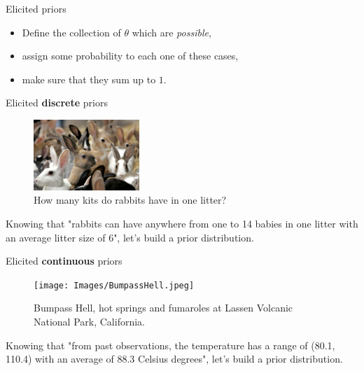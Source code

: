 \begin{frame}{Elicited priors}

	\begin{block}{}
		\begin{itemize}
			\item Define the collection of $\theta$ which are \textit{possible},
			\item assign some probability to each one of these cases,
			\item make sure that they sum up to $1$.
		\end{itemize}
	\end{block}

\end{frame}

\begin{frame}{Elicited \textbf{discrete} priors}

	\begin{figure}[ht]
		\centering
		\includegraphics[width=4cm]{Images/Rabbits.jpeg}
		\caption{How many kits do rabbits have in one litter?}
	\end{figure}

	Knowing that "rabbits can have anywhere from one to 14 babies in one litter with an 
	average litter size of 6", let's build a prior distribution.

\end{frame}

\begin{frame}{Elicited \textbf{continuous} priors}

	\begin{figure}[!ht]
		\centering
		\texttt{[image: Images/BumpassHell.jpeg]}
		\caption{Bumpass Hell, hot springs and fumaroles at Lassen Volcanic National Park, California.}
	\end{figure}

	Knowing that "from past observations, the temperature has a range of (80.1, 110.4) with an 
	average of 88.3 Celsius degrees", let's build a prior distribution.

\end{frame}

